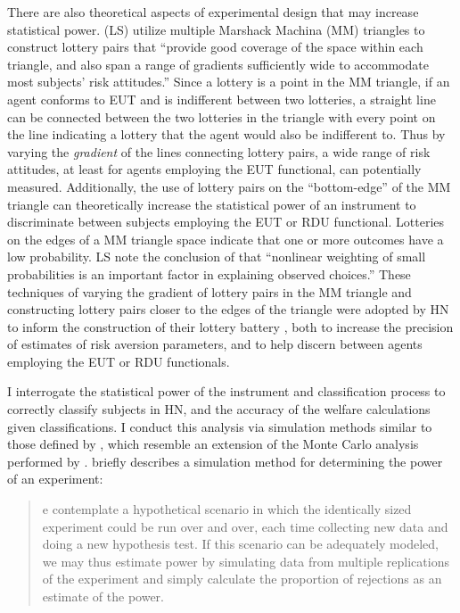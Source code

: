 \documentclass[../main.tex]{subfiles}
\begin{document}
There are also theoretical aspects of experimental design that may increase statistical power.
\textcite{Loomes1998} (LS) utilize multiple Marshack Machina (MM) triangles to construct lottery pairs that \enquote{provide good coverage of the space within each triangle, and also span a range of gradients sufficiently wide to accommodate most subjects' risk attitudes.}
Since a lottery is a point in the MM triangle, if an agent conforms to EUT and is indifferent between two lotteries, a straight line can be connected between the two lotteries in the triangle with every point on the line indicating a lottery that the agent would also be indifferent to.
Thus by varying the \textit{gradient} of the lines connecting lottery pairs, a wide range of risk attitudes, at least for agents employing the EUT functional, can potentially measured.
Additionally, the use of lottery pairs on the \enquote{bottom-edge} of the MM triangle can theoretically increase the statistical power of an instrument to discriminate between subjects employing the EUT or RDU functional.
Lotteries on the edges of a MM triangle space indicate that one or more outcomes have a low probability.
LS \parencite*[595]{Loomes1998} note the conclusion of \textcite[1285]{Harless1994} that \enquote{nonlinear weighting of small probabilities is an important factor in explaining observed choices.}
These techniques of varying the gradient of lottery pairs in the MM triangle and constructing lottery pairs closer to the edges of the triangle were adopted by HN to inform the construction of their lottery battery \parencite*[99]{Harrison2016}, both to increase the precision of estimates of risk aversion parameters, and to help discern between agents employing the EUT or RDU functionals.

I interrogate the statistical power of the instrument and classification process to correctly classify subjects in HN, and the accuracy of the welfare calculations given classifications.
I conduct this analysis via simulation methods similar to those defined by \textcite{Feiveson2002}, which resemble an extension of the Monte Carlo analysis performed by \textcite{Wilcox2015}.
\textcite[108]{Feiveson2002} briefly describes a simulation method for determining the power of an experiment:

\singlespacing
\blockquote{
e contemplate a hypothetical scenario in which the identically sized experiment could be run over and over, each time collecting new data and doing a new hypothesis test. 
If this scenario can be adequately modeled, we may thus estimate power by simulating data from multiple replications of the experiment and simply calculate the proportion of rejections  as an estimate of the power.
}
\doublespacing
\end{document}
